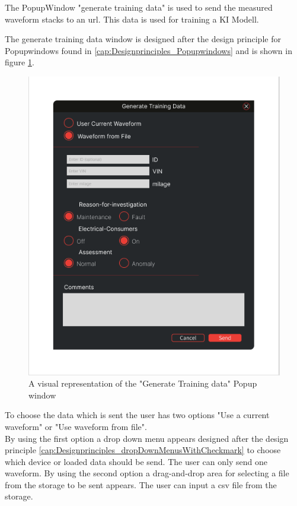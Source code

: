 \documentclass{scrreprt}
\begin{document}
The PopupWindow "generate training data" is used to send the measured waveform stacks to an url. This data is used for training a KI Modell. 

The generate training data window is designed after the design principle for Popupwindows found in \ref{cap:Designprinciples_Popupwindows} and is shown in figure \ref{fig: Generate Training data Popupwindow}.\\
\begin{figure}
    \includegraphics[width=.9\textwidth]{assets/pictures/GenerateTrainingDataMenu.png}
    \caption[]{A visual representation of the "Generate Training data" Popup window}
    \label{fig: Generate Training data Popupwindow}
\end{figure}
To choose the data which is sent the user has two options "Use a current waveform" or "Use waveform from file". \\

By using the first option a drop down menu appears designed after the design principle \ref{cap:Designprinciples_dropDownMenusWithCheckmark} to choose which device or loaded data should be send. The user can only send one waveform.
By using the second option a drag-and-drop area for selecting a file from the storage to be sent appears. The user can input a csv file from the storage.\\
\end{document}
